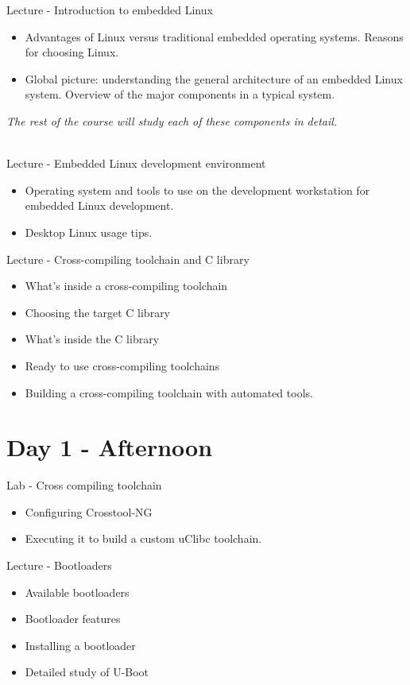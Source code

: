 \documentclass[a4paper,12pt,obeyspaces,spaces,hyphens]{article}
\begin{document}
\feagendaonecolumn
{Lecture - Introduction to embedded Linux}
{
  \begin{itemize}
  \item Advantages of Linux versus traditional embedded operating systems.
        Reasons for choosing Linux.
  \item Global picture: understanding the general architecture of an
        embedded Linux system. Overview of the major components in a typical
        system.
  \end{itemize}
  {\em The rest of the course will study each of these components in detail.}
}
\\
\feagendatwocolumn
{Lecture - Embedded Linux development environment}
{
  \begin{itemize}
  \item Operating system and tools to use on the development
        workstation for embedded Linux development.
  \item Desktop Linux usage tips.
  \end{itemize}
}
{Lecture - Cross-compiling toolchain and C library}
{
  \begin{itemize}
  \item What's inside a cross-compiling toolchain
  \item Choosing the target C library
  \item What's inside the C library
  \item Ready to use cross-compiling toolchains
  \item Building a cross-compiling toolchain with automated tools.
  \end{itemize}
}

\section{Day 1 - Afternoon}
\feagendatwocolumn
{Lab - Cross compiling toolchain}
{
  \begin{itemize}
  \item Configuring Crosstool-NG
  \item Executing it to build a custom uClibc toolchain.
  \end{itemize}
}
{Lecture - Bootloaders}
{
  \begin{itemize}
  \item Available bootloaders
  \item Bootloader features
  \item Installing a bootloader
  \item Detailed study of U-Boot
  \end{itemize}
}
\\
\end{document}

